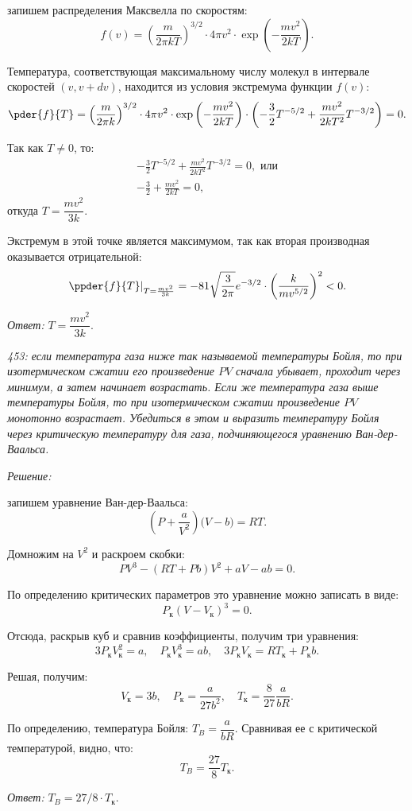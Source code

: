 \documentclass[pscyr]{hedsemwork}
\begin{document}
запишем распределения Максвелла по скоростям:
\[
  f(v) = \left( \frac{m}{2\pi kT} \right)^{3/2}\cdot 4\pi v^2\cdot
   \exp\left( -\frac{mv^2}{2kT} \right).
\]

Температура, соответствующая максимальному числу молекул в интервале скоростей
\( (v, v + dv) \), находится из условия экстремума функции \( f(v) \):
\[
  \pder{f}{T} = \left( \frac{m}{2\pi k} \right)^{3/2}\cdot 4\pi v^2\cdot
    \exp\left( -\frac{mv^2}{2kT} \right)\cdot
    \left(-\frac{3}{2}T^{-5/2} + \frac{mv^2}{2kT^2}T^{-3/2} \right) = 0.
\]

Так как \( T \ne 0 \), то:
\begin{gather*}
  -\frac{3}{2}T^{-5/2} + \frac{mv^2}{2kT^2}T^{-3/2} = 0, \text{ или} \\
  -\frac{3}{2} + \frac{mv^2}{2kT} = 0,
\end{gather*}
откуда \( T = \dfrac{mv^2}{3k} \).

Экстремум в этой точке является максимумом, так как вторая производная
оказывается отрицательной:
\[
  \left. \ppder{f}{T} \right|_{T = \frac{mv^2}{3k}} = -81
  \sqrt{\frac{3}{2\pi}}e^{-3/2}\cdot \left( \frac{k}{mv^{5/2}} \right)^2 < 0.
\]

\vspace*{2em}
\emph{Ответ:} \( T = \dfrac{mv^2}{3k} \).

\newpage %

\emph{453: если температура газа ниже так называемой температуры Бойля, то при
изотермическом сжатии его произведение \( PV \) сначала убывает, проходит через
минимум, а затем начинает возрастать. Если же температура газа выше температуры
Бойля, то при изотермическом сжатии произведение \( PV \) монотонно возрастает.
Убедиться в этом и выразить температуру Бойля через критическую температуру для
газа, подчиняющегося уравнению Ван-дер-Ваальса.}

\vspace*{2em}
\emph{Решение:}

запишем уравнение Ван-дер-Ваальса:
\[
  \left( P + \frac{a}{V^2} \right)\Big( V - b \Big) = RT.
\]

Домножим на \( V^2 \) и раскроем скобки:
\[
  PV^3 - (RT + Pb)V^2 + aV - ab = 0.
\]

По определению критических параметров это уравнение можно записать в виде:
\[
  P_\text{к}(V - V_\text{к})^3 = 0.
\]

Отсюда, раскрыв куб и сравнив коэффициенты, получим три уравнения:
\[
  3P_\text{к}V_\text{к}^2 = a, \quad
  P_\text{к}V_\text{к}^3 = ab, \quad
  3P_\text{к}V_\text{к} = RT_\text{к} + P_\text{к}b.
\]

Решая, получим:
\[
  V_\text{к} = 3b, \quad
  P_\text{к} = \frac{a}{27b^2}, \quad
  T_\text{к} = \frac{8}{27}\frac{a}{bR}.
\]

По определению, температура Бойля: \( T_B = \dfrac{a}{bR} \).
Сравнивая ее с критической температурой, видно, что:
\[
  T_B = \frac{27}{8}T_\text{к}.
\]

\vspace*{2em}
\emph{Ответ:} \( T_B = 27/8\cdot T_\text{к} \).
\end{document}
